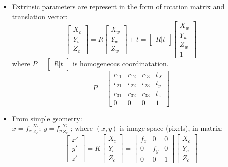 \documentclass{article}
\begin{document}
\begin{itemize}
	\item Extrinsic parameters are represent in the form of rotation matrix and translation vector:
	$$
	\begin{bmatrix}
		X_c\\ Y_c\\ Z_c
	\end{bmatrix} = R 
	\begin{bmatrix}
		X_w\\ Y_w\\ Z_w
	\end{bmatrix}	+ t =	
	\begin{bmatrix}
	R|t
	\end{bmatrix}
	\begin{bmatrix}
	    X_w\\ Y_w\\ Z_w\\1
	\end{bmatrix}
	$$
	where $P = \begin{bmatrix}	R|t	\end{bmatrix}$ is homogeneous coordinatation.
	$$ P = \begin{bmatrix}
        r_{11} & r_{12} & r_{13} & t_X\\
        r_{21} & r_{22} & r_{23} & t_y\\
        r_{31} & r_{32} & r_{33} & t_z\\
        0 & 0 & 0 & 1
        \end{bmatrix}
    $$
    \item From simple geometry: \\
    $
    	x = f_x\frac{X_c}{Z_c} ;\:
    	y = f_y\frac{Y_c}{Z_c}
    $ ; where $(x,y)$ is image space (pixels), in matrix: 
    $$\begin{bmatrix}
    x'\\y'\\z'
    \end{bmatrix} =
    K
        \begin{bmatrix}
    X_c \\ Y_c \\ Z_c
    \end{bmatrix}
    = 
    \begin{bmatrix}
    f_x & 0 & 0\\
    0 & f_y & 0 \\
    0 & 0 & 1
    \end{bmatrix}
    \begin{bmatrix}
    X_c \\ Y_c \\ Z_c

\end{bmatrix}$$
\end{itemize}
\end{document}
